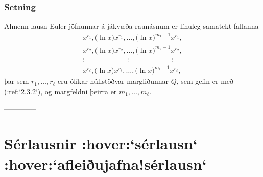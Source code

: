 \subsubsection{Setning}  Almenn lausn Euler-jöfnunnar á jákvæða raunásnum
er línuleg samatekt fallanna
\begin{gather*}
x^{r_1}, \big(\ln x \big) x^{r_1}, \dots,
\big(\ln x\big)^{m_1-1}x^{r_1},\\
x^{r_2}, \big(\ln x\big)x^{r_2}, \dots,
\big(\ln x \big)^{m_2-1} x^{r_2},\\
\vdots \qquad \qquad \qquad \vdots \qquad \qquad \qquad \vdots\\ 
x^{r_\ell}, \big(\ln x \big)x^{r_\ell}, \dots,
\big(\ln x\big)^{m_\ell-1} x^{r_\ell},
\end{gather*}
þar sem $r_1,\dots,r_\ell$ eru ólíkar núllstöðvar  margliðunnar
$Q$, sem gefin er með (:ref:`2.3.2`), og margfeldni þeirra er 
$m_1,\dots,m_\ell$.


--------------





\section{Sérlausnir :hover:`sérlausn` :hover:`afleiðujafna!sérlausn`}

